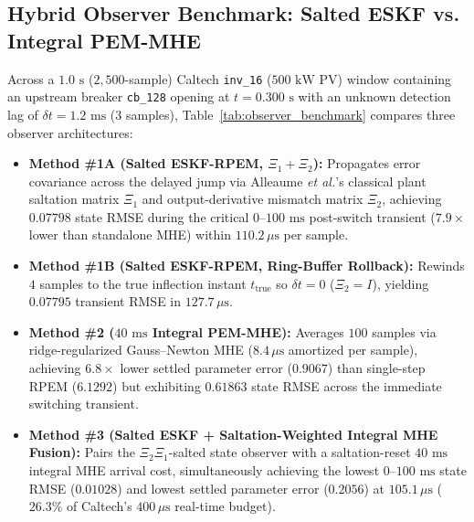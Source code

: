 \documentclass[11pt]{article}
\begin{document}
\subsection{Hybrid Observer Benchmark: Salted ESKF vs. Integral PEM-MHE}
Across a $1.0\text{ s}$ ($2{,}500$-sample) Caltech \texttt{inv\_16} ($500\text{ kW}$ PV) window containing an upstream breaker \texttt{cb\_128} opening at $t = 0.300\text{ s}$ with an unknown detection lag of $\delta t = 1.2\text{ ms}$ ($3$ samples), Table~\ref{tab:observer_benchmark} compares three observer architectures:
\begin{itemize}
    \item \textbf{Method \#1A (Salted ESKF-RPEM, $\Xi_1 + \Xi_2$):} Propagates error covariance across the delayed jump via Alleaume \textit{et al.}'s classical plant saltation matrix $\Xi_1$ and output-derivative mismatch matrix $\Xi_2$, achieving $0.07798$ state RMSE during the critical $0$--$100\text{ ms}$ post-switch transient ($7.9\times$ lower than standalone MHE) within $110.2\,\mu\text{s}$ per sample.
    \item \textbf{Method \#1B (Salted ESKF-RPEM, Ring-Buffer Rollback):} Rewinds $4$ samples to the true inflection instant $t_{\text{true}}$ so $\delta t = 0$ ($\Xi_2 = I$), yielding $0.07795$ transient RMSE in $127.7\,\mu\text{s}$.
    \item \textbf{Method \#2 ($40\text{ ms}$ Integral PEM-MHE):} Averages $100$ samples via ridge-regularized Gauss--Newton MHE ($8.4\,\mu\text{s}$ amortized per sample), achieving $6.8\times$ lower settled parameter error ($0.9067$) than single-step RPEM ($6.1292$) but exhibiting $0.61863$ state RMSE across the immediate switching transient.
    \item \textbf{Method \#3 (Salted ESKF + Saltation-Weighted Integral MHE Fusion):} Pairs the $\Xi_2\Xi_1$-salted state observer with a saltation-reset $40\text{ ms}$ integral MHE arrival cost, simultaneously achieving the lowest $0$--$100\text{ ms}$ state RMSE ($\mathbf{0.01028}$) and lowest settled parameter error ($\mathbf{0.2056}$) at $105.1\,\mu\text{s}$ ($26.3\%$ of Caltech's $400\,\mu\text{s}$ real-time budget).
\end{itemize}
\end{document}
